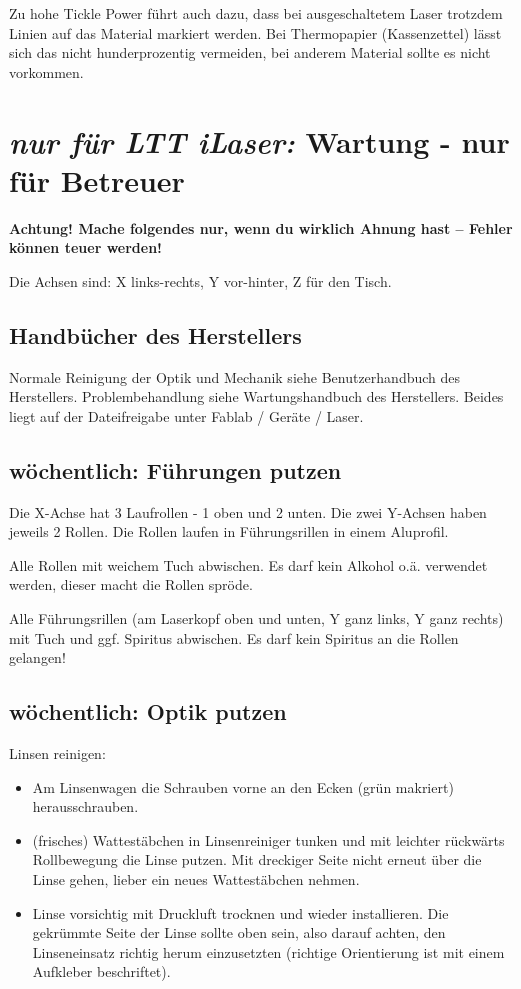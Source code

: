\documentclass{\basedir/fablab-document}
\newcommand{\nurLTT}{\emph{nur für LTT iLaser:} }
\begin{document}
	Zu hohe Tickle Power führt auch dazu, dass bei ausgeschaltetem Laser trotzdem Linien auf das Material markiert werden. Bei Thermopapier (Kassenzettel) lässt sich das nicht hunderprozentig vermeiden, bei anderem Material sollte es nicht vorkommen.


	\section{\nurLTT Wartung - nur für Betreuer}
	\label{sec:wartung-ltt}
	\textbf{Achtung! Mache folgendes nur, wenn du wirklich Ahnung hast -- Fehler können teuer werden!}

	Die Achsen sind: X links-rechts, Y vor-hinter, Z für den Tisch.

	\subsection{Handbücher des Herstellers}
	Normale Reinigung der Optik und Mechanik siehe Benutzerhandbuch des Herstellers. Problembehandlung siehe Wartungshandbuch des Herstellers. Beides liegt auf der Dateifreigabe unter Fablab / Geräte / Laser.

	\subsection{wöchentlich: Führungen putzen}
	Die X-Achse hat 3 Laufrollen - 1 oben und 2 unten. Die zwei Y-Achsen haben jeweils 2 Rollen. Die Rollen laufen in Führungsrillen in einem Aluprofil.

	Alle Rollen mit weichem Tuch abwischen. Es darf kein Alkohol o.ä. verwendet werden, dieser macht die Rollen spröde.

	Alle Führungsrillen (am Laserkopf oben und unten, Y ganz links, Y ganz rechts) mit Tuch und ggf. Spiritus abwischen. Es darf kein Spiritus an die Rollen gelangen!

	\subsection{wöchentlich: Optik putzen}

	Linsen reinigen:
	\begin{itemize}
		\item Am Linsenwagen die Schrauben vorne an den Ecken (grün makriert) herausschrauben.
		\item (frisches) Wattestäbchen in Linsenreiniger tunken und mit leichter rückwärts Rollbewegung die Linse putzen. Mit dreckiger Seite nicht erneut über die Linse gehen, lieber ein neues Wattestäbchen nehmen.
		\item Linse vorsichtig mit Druckluft trocknen und wieder installieren. Die gekrümmte Seite der Linse sollte oben sein, also darauf achten, den Linseneinsatz richtig herum einzusetzten (richtige Orientierung ist mit einem Aufkleber beschriftet).
	\end{itemize}
\end{document}
